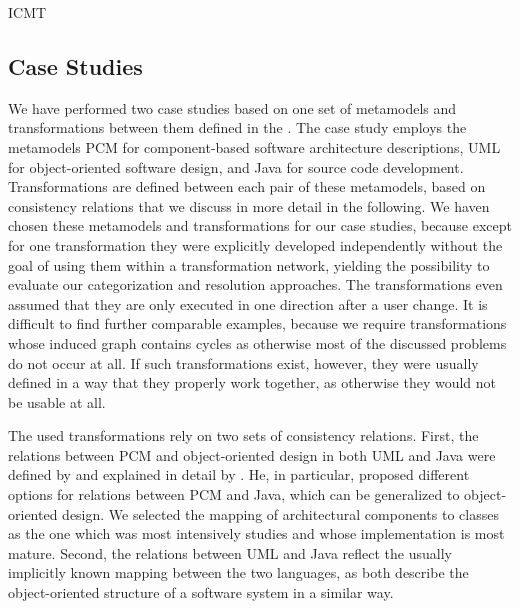 \begin{copiedFrom}{ICMT}



\subsection{Case Studies}

We have performed two case studies based on one set of metamodels and transformations between them defined in the \reactionslanguage.
The case study employs the metamodels \gls{PCM} for component-based software architecture descriptions, \gls{UML} for object-oriented software design, and Java for source code development.
Transformations are defined between each pair of these metamodels, based on consistency relations that we discuss in more detail in the following.
We haven chosen these metamodels and transformations for our case studies, because except for one transformation they were explicitly developed independently without the goal of using them within a transformation network, yielding the possibility to evaluate our categorization and resolution approaches.
The transformations even assumed that they are only executed in one direction after a user change.
It is difficult to find further comparable examples, because we require transformations whose induced graph contains cycles as otherwise most of the discussed problems do not occur at all.
If such transformations exist, however, they were usually defined in a way that they properly work together, as otherwise they would not be usable at all.

The used transformations rely on two sets of consistency relations.
First, the relations between \gls{PCM} and object-oriented design in both \gls{UML} and Java were defined by and explained in detail by \textcite{langhammer2015a, langhammer2017a}.
He, in particular, proposed different options for relations between \gls{PCM} and Java, which can be generalized to object-oriented design.
We selected the mapping of architectural components to classes as the one which was most intensively studies and whose implementation is most mature.
Second, the relations between \gls{UML} and Java reflect the usually implicitly known mapping between the two languages, as both describe the object-oriented structure of a software system in a similar way.


\end{copiedFrom}
